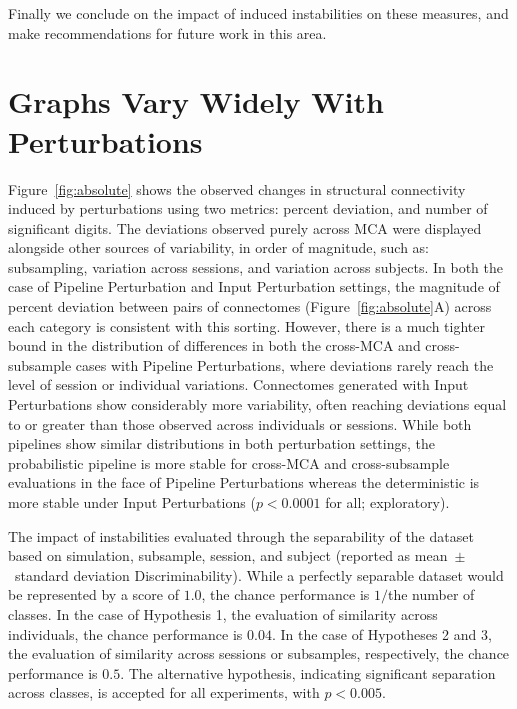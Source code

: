\documentclass[fleqn,10pt]{SelfArx} %
\begin{document}
Finally we conclude on the impact of induced instabilities on these measures, and make recommendations for future work
in this area.

\section*{Graphs Vary Widely With Perturbations}

Figure~\ref{fig:absolute} shows the observed changes in structural connectivity induced by perturbations using two
metrics: percent deviation, and number of significant digits. The deviations observed purely across MCA were displayed
alongside other sources of variability, in order of magnitude, such as: subsampling, variation across sessions, and
variation across subjects. In both the case of Pipeline Perturbation and Input Perturbation settings, the magnitude of
percent deviation between pairs of connectomes (Figure~\ref{fig:absolute}A) across each category is consistent with
this sorting. However, there is a much tighter bound in the distribution of differences in both the cross-MCA and
cross-subsample cases with Pipeline Perturbations, where deviations rarely reach the level of session or individual
variations. Connectomes generated with Input Perturbations show considerably more variability, often reaching
deviations equal to or greater than those observed across individuals or sessions. While both pipelines show similar
distributions in both perturbation settings, the probabilistic pipeline is more stable for cross-MCA and
cross-subsample evaluations in the face of Pipeline Perturbations whereas the deterministic is more stable under Input
Perturbations ($p < 0.0001$ for all; exploratory).

\begin{table}[ht]\centering
\caption{The impact of instabilities evaluated through the separability of the dataset based on simulation, subsample,
session, and subject (reported as mean~$\pm$~standard deviation Discriminability). While a perfectly separable dataset
would be represented by a score of $1.0$, the chance performance is $1 /$the number of classes. In the case of
Hypothesis 1, the evaluation of similarity across individuals, the chance performance is $0.04$. In the case of
Hypotheses 2 and 3, the evaluation of similarity across sessions or subsamples, respectively, the chance performance is
$0.5$. The alternative hypothesis, indicating significant separation across classes, is accepted for all experiments,
with $p < 0.005$.}
\vspace{5pt}

\label{tab:discrim}
\end{table}
\end{document}
